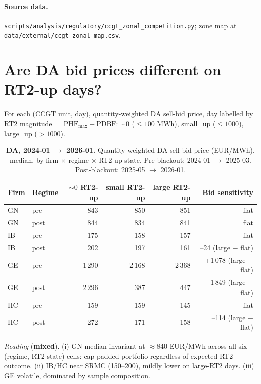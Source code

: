 \documentclass[11pt,a4paper]{article}
\newcommand{\code}[1]{\nolinkurl{#1}}
\begin{document}
\paragraph{Source data.} \code{scripts/analysis/regulatory/ccgt_zonal_competition.py};
zone map at \code{data/external/ccgt_zonal_map.csv}.


\section{Are DA bid prices different on RT2-up days?}\label{sec:prov:bid_vs_rt2}

\noindent For each (CCGT unit, day), quantity-weighted DA sell-bid price, day labelled by RT2 magnitude $= \mathrm{PHF}_{\max} - \mathrm{PDBF}$: $\sim 0$ ($\le 100$ MWh), small\_up ($\le 1000$), large\_up ($> 1000$).

\begin{table}[H]
\centering
\caption{\textbf{DA, 2024-01 $\to$ 2026-01.} Quantity-weighted DA sell-bid price (EUR/MWh), median, by firm $\times$ regime $\times$ RT2-up state. Pre-blackout: 2024-01 $\to$ 2025-03. Post-blackout: 2025-05 $\to$ 2026-01.}
\label{tab:bid_vs_rt2}
\begin{tabular}{l l r r r r}
\toprule
Firm & Regime & $\sim 0$ RT2-up & small RT2-up & large RT2-up & Bid sensitivity \\
\midrule
GN & pre  & 843 & 850 & 851 & flat \\
GN & post & 844 & 834 & 841 & flat \\
\addlinespace
IB & pre  & 175 & 158 & 157 & flat \\
IB & post & 202 & 197 & 161 & --24 (large $-$ flat) \\
\addlinespace
GE & pre  & 1\,290 & 2\,168 & 2\,368 & +1\,078 (large $-$ flat) \\
GE & post & 2\,296 & 387   & 447   & --1\,849 (large $-$ flat) \\
\addlinespace
HC & pre  & 159 & 159 & 145 & flat \\
HC & post & 272 & 171 & 158 & --114 (large $-$ flat) \\
\bottomrule
\end{tabular}
\end{table}

\textit{Reading} (\textbf{mixed}). (i) GN median invariant at $\approx 840$ EUR/MWh across all six (regime, RT2-state) cells: cap-padded portfolio regardless of expected RT2 outcome. (ii) IB/HC near SRMC (150--200), mildly lower on large-RT2 days. (iii) GE volatile, dominated by sample composition.
\end{document}
